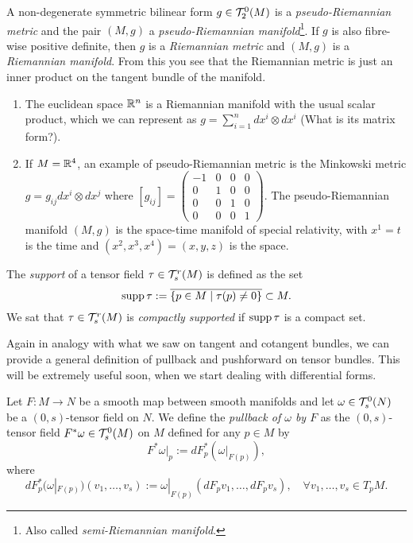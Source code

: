 \begin{example}
  A non-degenerate symmetric bilinear form $g\in \mathcal{T}_2^0(M)$ is a \emph{pseudo-Riemannian metric} and the pair $(M,g)$ a \emph{pseudo-Riemannian manifold}\footnote{Also called \emph{semi-Riemannian manifold}.}.
  If $g$ is also fibre-wise positive definite, then $g$ is a \emph{Riemannian metric} and $(M,g)$ is a \emph{Riemannian manifold}.
  From this you see that the Riemannian metric is just an inner product on the tangent bundle of the manifold.

  \begin{enumerate}
    \item The euclidean space $\mathbb{R}^n$ is a Riemannian manifold with the usual scalar product, which we can represent as $g = \sum_{i=1}^n dx^i\otimes dx^i$ (What is its matrix form?).
    \item If $M=\mathbb{R}^4$, an example of pseudo-Riemannian metric is the Minkowski metric $g = g_{ij} dx^i\otimes dx^j$ where $[g_{ij}] = {\left(\begin{smallmatrix} -1 & 0 & 0 & 0\\ 0 & 1 & 0 & 0 \\ 0 & 0 & 1 & 0 \\ 0 & 0 & 0 & 1 \end{smallmatrix}\right)}$. The pseudo-Riemannian manifold $(M, g)$ is the space-time manifold of special relativity, with $x^1 = t$ is the time and $(x^2, x^3, x^4) = (x,y,z)$ is the space.
  \end{enumerate}
\end{example}

\begin{definition}
  The \emph{support} of a tensor field $\tau\in\mathcal{T}_s^r(M)$ is defined as the set
  \begin{equation}
    \operatorname{supp} \tau := \overline{\{p\in M\mid \tau(p) \neq 0\}} \subset M.
  \end{equation}
  We sat that $\tau\in\mathcal{T}_s^r(M)$ is \emph{compactly supported} if $\operatorname{supp}\tau$ is a compact set.
\end{definition}

Again in analogy with what we saw on tangent and cotangent bundles, we can provide a general definition of pullback and pushforward on tensor bundles.
This will be extremely useful soon, when we start dealing with differential forms.

\begin{definition}
  Let $F:M\to N$ be a smooth map between smooth manifolds and let $\omega \in \mathcal{T}_s^0(N)$ be a $(0,s)$-tensor field on $N$. We define the \emph{pullback of $\omega$ by $F$} as the $(0,s)$-tensor field $F^*\omega \in \mathcal{T}_s^0(M)$ on $M$ defined for any $p\in M$ by
  \begin{equation}
    F^*\omega|_p := dF^*_p(\omega|_{F(p)}),
  \end{equation}
  where
  \begin{equation}
    dF^*_p(\omega|_{F(p)})(v_1, \ldots, v_s) := \omega|_{F(p)} (dF_p v_1, \ldots, dF_p v_s), \quad\forall v_1, \ldots, v_s \in T_p M.
  \end{equation}
\end{definition}

